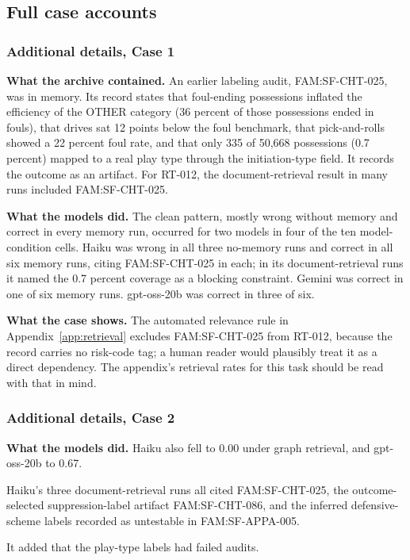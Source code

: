 \documentclass[11pt]{article}
\begin{document}
\FloatBarrier

\subsection{Full case accounts}
\label{app:cases}

\subsubsection{Additional details, Case 1}

\textbf{What the archive contained.} An earlier labeling audit, FAM:SF-CHT-025, was in memory. Its record states that foul-ending possessions inflated the efficiency of the OTHER category (36 percent of those possessions ended in fouls), that drives sat 12 points below the foul benchmark, that pick-and-rolls showed a 22 percent foul rate, and that only 335 of 50,668 possessions (0.7 percent) mapped to a real play type through the initiation-type field. It records the outcome as an artifact. For RT-012, the document-retrieval result in many runs included FAM:SF-CHT-025.

\textbf{What the models did.} The clean pattern, mostly wrong without memory and correct in every memory run, occurred for two models in four of the ten model-condition cells. Haiku was wrong in all three no-memory runs and correct in all six memory runs, citing FAM:SF-CHT-025 in each; in its document-retrieval runs it named the 0.7 percent coverage as a blocking constraint. Gemini was correct in one of six memory runs. gpt-oss-20b was correct in three of six.

\textbf{What the case shows.} The automated relevance rule in Appendix~\ref{app:retrieval} excludes FAM:SF-CHT-025 from RT-012, because the record carries no risk-code tag; a human reader would plausibly treat it as a direct dependency. The appendix's retrieval rates for this task should be read with that in mind.

\subsubsection{Additional details, Case 2}

\textbf{What the models did.} Haiku also fell to 0.00 under graph retrieval, and gpt-oss-20b to 0.67.

{\sloppy Haiku's three document-retrieval runs all cited FAM:SF-CHT-025, the outcome-selected suppression-label artifact FAM:SF-CHT-086, and the inferred defensive-scheme labels recorded as untestable in FAM:SF-APPA-005.\par} It added that the play-type labels had failed audits.
\end{document}
